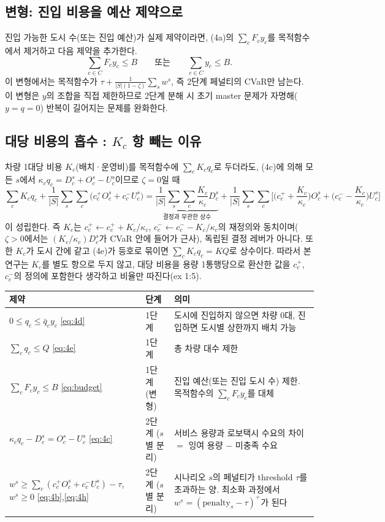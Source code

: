 \documentclass[10pt,a4paper]{article}
\begin{document}
\subsection{변형: 진입 비용을 예산 제약으로}

진입 가능한 도시 수(또는 진입 예산)가 실제 제약이라면, (4a)의 $\sum_c F_c y_c$를 목적함수에서 제거하고 다음 제약을 추가한다.
\begin{equation}\label{eq:budget}
\sum_{c\in C}F_c y_c\le B \qquad\text{또는}\qquad \sum_{c\in C}y_c\le B.
\end{equation}
이 변형에서는 목적함수가 $\tau+\frac{1}{|S|(1-\zeta)}\sum_s w^s$, 즉 2단계 페널티의 CVaR만 남는다. 이 변형은 $y$의 조합을 직접 제한하므로 2단계 분해 시 초기 master 문제가 자명해($y=q=0$) 반복이 길어지는 문제를 완화한다.

\subsection{대당 비용의 흡수 : $K_c$ 항 빼는 이유}\label{sec:absorb}

차량 1대당 비용 $K_c$(배치·운영비)를 목적함수에 $\sum_c K_c q_c$로 두더라도, (4c)에 의해 모든 $s$에서 $\kappa_c q_c=D_c^s+O_c^s-U_c^s$이므로 $\zeta=0$일 때
\begin{equation}\label{eq:absorb}
\sum_{c}K_c q_c+\frac1{|S|}\sum_{s}\sum_{c}\big(c_c^+O_c^s+c_c^-U_c^s\big)
=\underbrace{\frac1{|S|}\sum_s\sum_c\frac{K_c}{\kappa_c}D_c^s}_{\text{결정과 무관한 상수}}
+\frac1{|S|}\sum_{s}\sum_{c}\Big[\Big(c_c^++\frac{K_c}{\kappa_c}\Big)O_c^s+\Big(c_c^--\frac{K_c}{\kappa_c}\Big)U_c^s\Big]
\end{equation}
이 성립한다. 즉 $K_c$는 $c_c^+\leftarrow c_c^++K_c/\kappa_c$, $c_c^-\leftarrow c_c^--K_c/\kappa_c$의 재정의와 동치이며($\zeta>0$에서는 $(K_c/\kappa_c)D_c^s$가 CVaR 안에 들어가 근사), 독립된 결정 레버가 아니다. 또한 $K_c$가 도시 간에 같고 (4e)가 등호로 묶이면 $\sum_c K_c q_c=KQ$로 상수이다. 따라서 본 연구는 $K_c$를 별도 항으로 두지 않고, 대당 비용을 용량 1통행당으로 환산한 값을 $c_c^+$, $c_c^-$의 정의에 포함한다 생각하고 비율만 따진다(ex 1:5).

{\footnotesize
\begin{longtable}{@{}L{0.34\textwidth}L{0.12\textwidth}L{0.50\textwidth}@{}}
\toprule 제약 & 단계 & 의미\\\midrule\endhead\bottomrule\endlastfoot
$0\le q_c\le\bar q_c y_c$ \eqref{eq:4d} & 1단계 & 도시에 진입하지 않으면 차량 0대, 진입하면 도시별 상한까지 배치 가능\\
$\sum_c q_c\le Q$ \eqref{eq:4e} & 1단계 & 총 차량 대수 제한\\
$\sum_c F_c y_c\le B$ \eqref{eq:budget} & 1단계 (변형) & 진입 예산(또는 진입 도시 수) 제한. 목적함수의 $\sum_c F_c y_c$를 대체\\
$\kappa_c q_c-D_c^s=O_c^s-U_c^s$ \eqref{eq:4c} & 2단계 ($s$별 분리) & 서비스 용량과 로보택시 수요의 차이 $=$ 잉여 용량 $-$ 미충족 수요\\
$w^s\ge\sum_c(c_c^+O_c^s+c_c^-U_c^s)-\tau$, $w^s\ge0$ \eqref{eq:4b},\eqref{eq:4h} & 2단계 ($s$별 분리) & 시나리오 $s$의 페널티가 threshold $\tau$를 초과하는 양. 최소화 과정에서 $w^s=(\text{penalty}_s-\tau)^+$가 된다\\
\end{longtable}}
\end{document}
